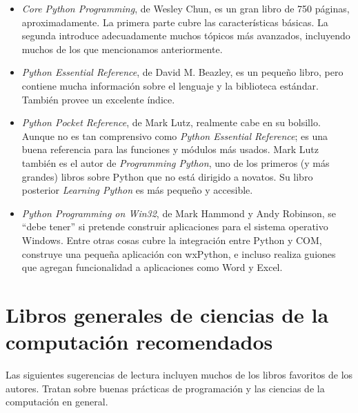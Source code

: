 \begin{itemize}

\item {\em Core Python Programming}, de Wesley Chun, es un gran libro
de 750 páginas, aproximadamente. La primera parte cubre las características
básicas. La segunda introduce adecuadamente muchos tópicos más avanzados,
incluyendo muchos de los que mencionamos anteriormente.

\item {\em Python Essential Reference}, de David M. Beazley, es un 
pequeño libro, pero contiene mucha información sobre el lenguaje
y la biblioteca estándar. También provee un excelente índice.

\item {\em Python Pocket Reference}, de Mark Lutz, realmente cabe 
en su bolsillo. Aunque no es tan comprensivo como {\em Python Essential
Reference}; es una buena referencia para las funciones y módulos más
usados.  Mark Lutz también es el autor de {\em Programming Python},
uno de los primeros (y más grandes) libros sobre Python que no está
dirigido a novatos. Su libro posterior {\em Learning Python} es más
pequeño y accesible.

\item {\em Python Programming on Win32}, de Mark Hammond y Andy
Robinson, se ``debe tener'' si pretende construir aplicaciones
para el sistema operativo Windows. Entre otras cosas cubre la
integración entre Python y COM, construye una pequeña aplicación con
 wxPython, e incluso realiza guiones que agregan funcionalidad
a aplicaciones como Word y Excel.

\end{itemize}

\section{Libros generales de ciencias de la computación recomendados}

Las siguientes sugerencias de lectura incluyen muchos de los libros
favoritos de los autores. Tratan sobre buenas prácticas de programación
y las ciencias de la computación en general.

